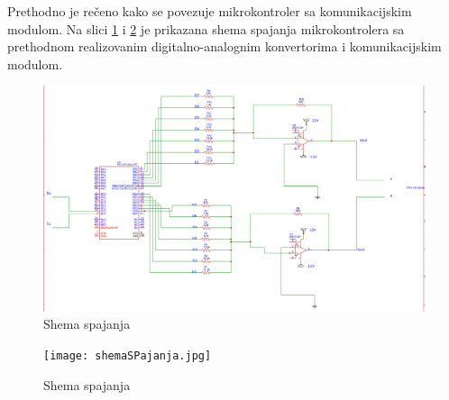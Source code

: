\documentclass[12pt]{article}
\begin{document}
Prethodno je rečeno kako se povezuje mikrokontroler sa komunikacijskim modulom. Na slici \ref{fig:glavnasema} i \ref{fig:glavnasemalive} je prikazana shema spajanja mikrokontrolera sa prethodnom realizovanim digitalno-analognim konvertorima i komunikacijskim modulom.
\begin{figure}[h!]
    \centering
  \includegraphics[scale=0.33]{Schematic_123New-Project_example_20190204180149.png}
  \caption{Shema spajanja}
  \label{fig:glavnasema}
\end{figure}
\begin{figure}[h!]
    \centering
  \texttt{[image: shemaSPajanja.jpg]}
  \caption{Shema spajanja}
  \label{fig:glavnasemalive}
\end{figure}
\newline
\end{document}
